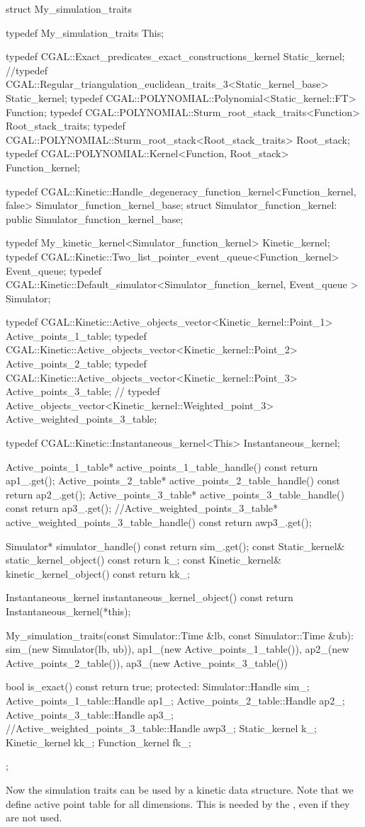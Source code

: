 \begin{ccExampleCode}
struct My_simulation_traits {
  typedef My_simulation_traits This;

  typedef CGAL::Exact_predicates_exact_constructions_kernel Static_kernel;
  //typedef CGAL::Regular_triangulation_euclidean_traits_3<Static_kernel_base> Static_kernel;
  typedef CGAL::POLYNOMIAL::Polynomial<Static_kernel::FT> Function;
  typedef CGAL::POLYNOMIAL::Sturm_root_stack_traits<Function> Root_stack_traits;
  typedef CGAL::POLYNOMIAL::Sturm_root_stack<Root_stack_traits> Root_stack;
  typedef CGAL::POLYNOMIAL::Kernel<Function, Root_stack> Function_kernel;

  typedef CGAL::Kinetic::Handle_degeneracy_function_kernel<Function_kernel, false>  Simulator_function_kernel_base;
  struct Simulator_function_kernel: public Simulator_function_kernel_base{};

  typedef My_kinetic_kernel<Simulator_function_kernel> Kinetic_kernel;
  typedef CGAL::Kinetic::Two_list_pointer_event_queue<Function_kernel> Event_queue;
  typedef CGAL::Kinetic::Default_simulator<Simulator_function_kernel, Event_queue > Simulator;

  typedef CGAL::Kinetic::Active_objects_vector<Kinetic_kernel::Point_1> Active_points_1_table;
  typedef CGAL::Kinetic::Active_objects_vector<Kinetic_kernel::Point_2> Active_points_2_table;
  typedef CGAL::Kinetic::Active_objects_vector<Kinetic_kernel::Point_3> Active_points_3_table;
  // typedef Active_objects_vector<Kinetic_kernel::Weighted_point_3> Active_weighted_points_3_table;
 
  typedef CGAL::Kinetic::Instantaneous_kernel<This> Instantaneous_kernel;

  Active_points_1_table* active_points_1_table_handle() const { return ap1_.get();}
  Active_points_2_table* active_points_2_table_handle() const {return ap2_.get();}
  Active_points_3_table* active_points_3_table_handle() const {return ap3_.get();}
  //Active_weighted_points_3_table* active_weighted_points_3_table_handle() const {return awp3_.get();}

  Simulator* simulator_handle() const { return sim_.get();}
  const Static_kernel& static_kernel_object() const {return k_;}
  const Kinetic_kernel& kinetic_kernel_object() const {return kk_;}
 
  Instantaneous_kernel instantaneous_kernel_object() const {
    return Instantaneous_kernel(*this);
  }

  My_simulation_traits(const Simulator::Time &lb,
		       const Simulator::Time &ub): sim_(new Simulator(lb, ub)),
						   ap1_(new Active_points_1_table()),
						   ap2_(new Active_points_2_table()),
						   ap3_(new Active_points_3_table())
  {}
 
  
  bool is_exact() const {
    return true;
  }
protected:
  Simulator::Handle sim_;
  Active_points_1_table::Handle ap1_;
  Active_points_2_table::Handle ap2_;
  Active_points_3_table::Handle ap3_;
  //Active_weighted_points_3_table::Handle awp3_;
  Static_kernel k_;
  Kinetic_kernel kk_;
  Function_kernel fk_;
};

\end{ccExampleCode}

Now the simulation traits can be used by a kinetic data structure.
Note that we define active point table for all dimensions. This is
needed by the , even if they are not
used.

